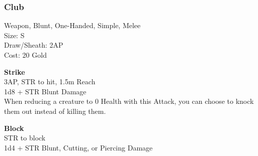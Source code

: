 \subsubsection{Club}\label{weapon:club}
Weapon, Blunt, One-Handed, Simple, Melee\\
Size: S\\
Draw/Sheath: 2AP\\
Cost: 20 Gold

\textbf{Strike}\\
3AP, STR to hit, 1.5m Reach\\
1d8 + \texttimes STR Blunt Damage\\
When reducing a creature to 0 Health with this Attack, you can choose to knock them out instead of killing them.

\textbf{Block}\\
STR to block\\
1d4 + \texttimes STR Blunt, Cutting, or Piercing Damage

